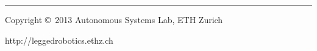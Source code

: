 \documentclass[10pt,landscape,a4paper]{article}
\makeatletter
\renewcommand{\subsubsection}{\@startsection{subsubsection}{3}{0mm}%
                                {-1ex plus -.5ex minus -.2ex}%
                                {1ex plus .2ex}%
                                {\normalfont\small\bfseries}}
\makeatother
\begin{document}
\begin{multicols}{2}




\rule{0.3\linewidth}{0.25pt}
\scriptsize

Copyright \copyright\ 2013 Autonomous Systems Lab, ETH Zurich

http://leggedrobotics.ethz.ch


\end{multicols}
\end{document}
